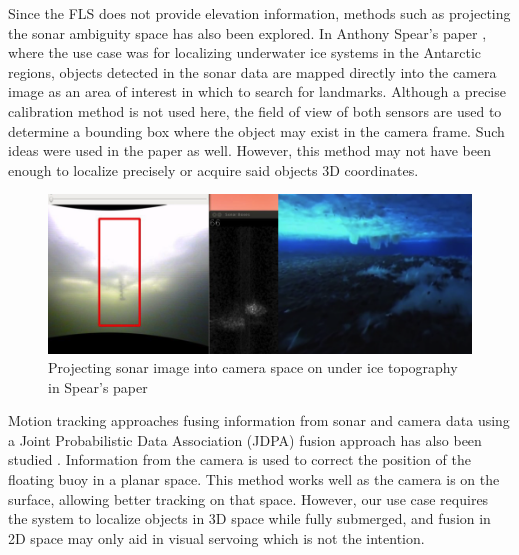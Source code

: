 \documentclass[15pt]{article}
\begin{document}
Since the FLS does not provide elevation information, methods such as projecting the sonar ambiguity space has also been explored. In Anthony Spear’s paper \cite{Spears}, where the use case was for localizing underwater ice systems in the Antarctic regions, objects detected in the sonar data are mapped directly into the camera image as an area of interest in which to search for landmarks. Although a precise calibration method is not used here, the field of view of both sensors are used to determine a bounding box where the object may exist in the camera frame. Such ideas were used in the paper as well. However, this method may not have been enough to localize precisely or acquire said objects 3D coordinates.

\begin{figure}[h!]
  \centering
  \includegraphics[scale=0.5]{ice}
  \captionsetup{justification=centering}
  \caption{Projecting sonar image into camera space on under ice topography in Spear's paper}
\end{figure}

Motion tracking approaches fusing information from sonar and camera data using a Joint Probabilistic Data Association (JDPA) fusion approach has also been studied \cite{Krout2011}. Information from the camera is used to correct the position of the floating buoy in a planar space. This method works well as the camera is on the surface, allowing better tracking on that space. However, our use case requires the system to localize objects in 3D space while fully submerged, and fusion in 2D space may only aid in visual servoing which is not the intention.
\end{document}
